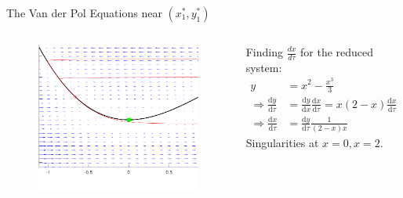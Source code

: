 \documentclass[11pt]{beamer}
\newcommand{\dif}{\mathrm{d}}
\begin{document}
\begin{frame}{The Van der Pol Equations near $(x_1^*,y_1^*)$}
\begin{columns}
\begin{figure}[h!]
    \centering
    \includegraphics[width=\textwidth]{PPlanecrop.png}
\end{figure}
Finding $\frac{dx}{d \tau}$ for the reduced system:
\begin{align*}
y&= x^2 - \frac{x^3}{3}\\
\Rightarrow \frac{\dif y}{\dif \tau}  &= \frac{\dif y}{\dif x} \frac{\dif x}{\dif\tau}  = x(2-x)\frac{\dif x}{\dif\tau}\\
\Rightarrow \frac{\dif x}{\dif\tau}&= \frac{\dif y}{\dif\tau}\frac{1}{(2-x)x}
\end{align*}
\newline
Singularities at $x=0,x=2$.
\end{columns}
\end{frame}
\end{document}
